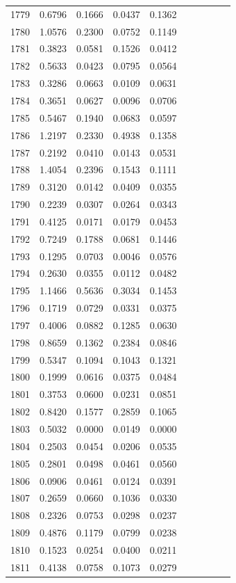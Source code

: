 \begin{table}
\begin{tabular}{cccccccccc}
1779& 0.6796& 0.1666& 0.0437& 0.1362\\ 
1780& 1.0576& 0.2300& 0.0752& 0.1149\\ 
1781& 0.3823& 0.0581& 0.1526& 0.0412\\ 
1782& 0.5633& 0.0423& 0.0795& 0.0564\\ 
1783& 0.3286& 0.0663& 0.0109& 0.0631\\ 
1784& 0.3651& 0.0627& 0.0096& 0.0706\\ 
1785& 0.5467& 0.1940& 0.0683& 0.0597\\ 
1786& 1.2197& 0.2330& 0.4938& 0.1358\\ 
1787& 0.2192& 0.0410& 0.0143& 0.0531\\ 
1788& 1.4054& 0.2396& 0.1543& 0.1111\\ 
1789& 0.3120& 0.0142& 0.0409& 0.0355\\ 
1790& 0.2239& 0.0307& 0.0264& 0.0343\\ 
1791& 0.4125& 0.0171& 0.0179& 0.0453\\ 
1792& 0.7249& 0.1788& 0.0681& 0.1446\\ 
1793& 0.1295& 0.0703& 0.0046& 0.0576\\ 
1794& 0.2630& 0.0355& 0.0112& 0.0482\\ 
1795& 1.1466& 0.5636& 0.3034& 0.1453\\ 
1796& 0.1719& 0.0729& 0.0331& 0.0375\\ 
1797& 0.4006& 0.0882& 0.1285& 0.0630\\ 
1798& 0.8659& 0.1362& 0.2384& 0.0846\\ 
1799& 0.5347& 0.1094& 0.1043& 0.1321\\ 
1800& 0.1999& 0.0616& 0.0375& 0.0484\\ 
1801& 0.3753& 0.0600& 0.0231& 0.0851\\ 
1802& 0.8420& 0.1577& 0.2859& 0.1065\\ 
1803& 0.5032& 0.0000& 0.0149& 0.0000\\ 
1804& 0.2503& 0.0454& 0.0206& 0.0535\\ 
1805& 0.2801& 0.0498& 0.0461& 0.0560\\ 
1806& 0.0906& 0.0461& 0.0124& 0.0391\\ 
1807& 0.2659& 0.0660& 0.1036& 0.0330\\ 
1808& 0.2326& 0.0753& 0.0298& 0.0237\\ 
1809& 0.4876& 0.1179& 0.0799& 0.0238\\ 
1810& 0.1523& 0.0254& 0.0400& 0.0211\\ 
1811& 0.4138& 0.0758& 0.1073& 0.0279\\ 

\end{tabular}
\end{table}
